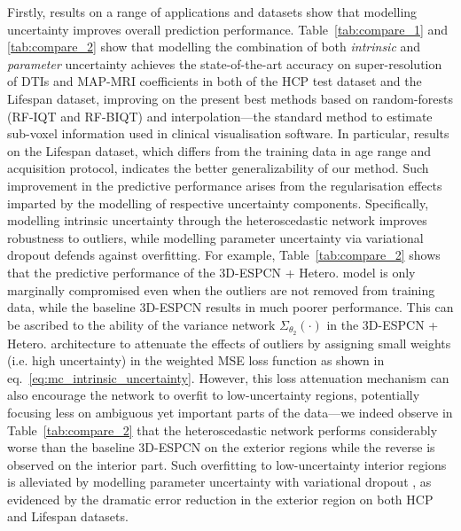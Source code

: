 Firstly, results on a range of applications and datasets show that modelling uncertainty improves overall prediction performance. Table~\ref{tab:compare_1} and \ref{tab:compare_2} show that modelling the combination of both \textit{intrinsic} and \textit{parameter} uncertainty achieves the state-of-the-art accuracy on super-resolution of DTIs and MAP-MRI coefficients in both of the HCP test dataset and the Lifespan dataset, improving on the present best methods based on random-forests (RF-IQT\cite{alexander2017image} and RF-BIQT\cite{tanno2016bayesian}) and interpolation---the standard method to estimate sub-voxel information used in clinical visualisation software. In particular, results on the Lifespan dataset, which differs from the training data in age range and acquisition protocol, indicates the better generalizability of our method. Such improvement in the predictive performance arises from the regularisation effects imparted by the modelling of respective uncertainty components. Specifically, modelling intrinsic uncertainty through the heteroscedastic network improves robustness to outliers, while modelling parameter uncertainty via variational dropout defends against overfitting. For example,  Table~\ref{tab:compare_2} shows that the predictive performance of the 3D-ESPCN + Hetero. model is only marginally compromised even when the outliers are not removed from training data, while the baseline 3D-ESPCN results in much poorer performance. This can be ascribed to the ability of the variance network $\Sigma_{\theta_2}(\cdot)$ in the 3D-ESPCN + Hetero. architecture to attenuate the effects of outliers by assigning small weights (i.e. high uncertainty) in the weighted MSE loss function as shown in eq.~\eqref{eq:mc_intrinsic_uncertainty}. However, this loss attenuation mechanism can also encourage the network to overfit to low-uncertainty regions, potentially focusing less on ambiguous yet important parts of the data---we indeed observe in Table~\ref{tab:compare_2}  that the heteroscedastic network performs considerably worse than the baseline 3D-ESPCN on the exterior regions while the reverse is observed on the interior part. Such overfitting to low-uncertainty interior regions is alleviated by modelling parameter uncertainty with variational dropout \cite{kingma2015variational}, as evidenced by the dramatic error reduction in the exterior region on both HCP and Lifespan datasets. 

